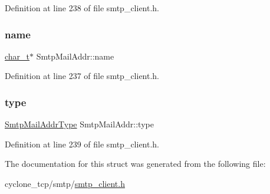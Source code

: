 Definition at line 238 of file smtp\+\_\+client.\+h.

\mbox{\label{structSmtpMailAddr_abe3a319474a330d936a68706c96a6035}} 
\subsubsection{\texorpdfstring{name}{name}}
{\footnotesize\ttfamily \hyperlink{compiler__port_8h_a40bb5262bf908c328fbcfbe5d29d0201}{char\+\_\+t}$\ast$ Smtp\+Mail\+Addr\+::name}



Definition at line 237 of file smtp\+\_\+client.\+h.

\mbox{\label{structSmtpMailAddr_a7c5a5b0c3fd17a3256564105e46a3933}} 
\subsubsection{\texorpdfstring{type}{type}}
{\footnotesize\ttfamily \hyperlink{smtp__client_8h_aeee50722ccc5015c4fdc33b13819126e}{Smtp\+Mail\+Addr\+Type} Smtp\+Mail\+Addr\+::type}



Definition at line 239 of file smtp\+\_\+client.\+h.



The documentation for this struct was generated from the following file\+:\begin{DoxyCompactItemize}
\item 
cyclone\+\_\+tcp/smtp/\hyperlink{smtp__client_8h}{smtp\+\_\+client.\+h}\end{DoxyCompactItemize}
